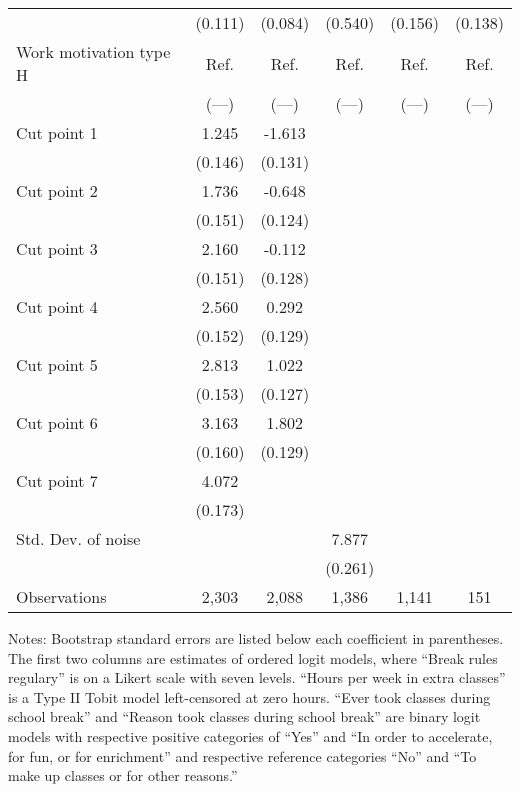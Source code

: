 \begin{table}[ht]
{\begin{threeparttable}
\begin{tabular}{lccccc}
 & (0.111) & (0.084) & (0.540) & (0.156) & (0.138) \\ 
Work motivation type H & Ref. & Ref. & Ref. & Ref. & Ref. \\ 
 & (---) & (---) & (---) & (---) & (---) \\ 
Cut point 1 & 1.245 & -1.613 &  &  &  \\ 
 & (0.146) & (0.131) &  &  &  \\ 
Cut point 2 & 1.736 & -0.648 &  &  &  \\ 
 & (0.151) & (0.124) &  &  &  \\ 
Cut point 3 & 2.160 & -0.112 &  &  &  \\ 
 & (0.151) & (0.128) &  &  &  \\ 
Cut point 4 & 2.560 & 0.292 &  &  &  \\ 
 & (0.152) & (0.129) &  &  &  \\ 
Cut point 5 & 2.813 & 1.022 &  &  &  \\ 
 & (0.153) & (0.127) &  &  &  \\ 
Cut point 6 & 3.163 & 1.802 &  &  &  \\ 
 & (0.160) & (0.129) &  &  &  \\ 
Cut point 7 & 4.072 &  &  &  &  \\ 
 & (0.173) &  &  &  &  \\ 
Std. Dev. of noise &  &  & 7.877 &  &  \\ 
 &  &  & (0.261) &  &  \\ 
\midrule
Observations & 2,303 & 2,088 & 1,386 & 1,141 & 151 \\ 
\bottomrule
\end{tabular}
\footnotesize Notes: Bootstrap standard errors are listed below each coefficient in parentheses. The first two columns are estimates of ordered logit models, where ``Break rules regulary'' is on a Likert scale with seven levels. ``Hours per week in extra classes'' is a Type II Tobit model left-censored at zero hours. ``Ever took classes during school break'' and ``Reason took classes during school break'' are binary logit models with respective positive categories of ``Yes'' and ``In order to accelerate, for fun, or for enrichment'' and respective reference categories ``No'' and ``To make up classes or for other reasons.'' 
\end{threeparttable}
}
\end{table}
